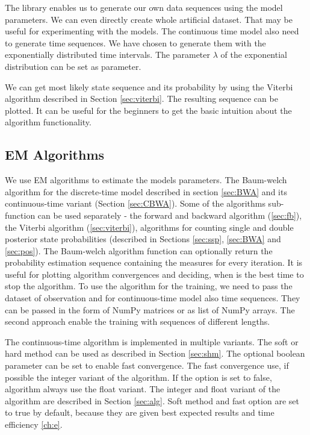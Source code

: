 \documentclass[thesis=M,english]{FITthesis}[2012/10/20]
\begin{document}
The library enables us to generate our own data sequences using the model parameters. We can even directly create whole artificial dataset. That may be useful for experimenting with the models. 
The continuous time model also need to generate time sequences. We have chosen to generate them with the exponentially distributed time intervals. The parameter $\lambda$ of the exponential distribution can be set as parameter.   

We can get most likely state sequence and its probability by using the Viterbi algorithm described in Section \ref{sec:viterbi}. The resulting sequence can be plotted. It can be useful for the beginners to get the basic intuition about the algorithm functionality.   

\subsection{EM Algorithms}

We use EM algorithms to estimate the models parameters. The Baum-welch algorithm for the discrete-time model described in section \ref{sec:BWA} and its continuous-time variant (Section \ref{sec:CBWA}). Some of the algorithms sub-function can be used separately - the forward and backward algorithm (\ref{sec:fb}), the Viterbi algorithm  (\ref{sec:viterbi}), algorithms for counting single and double posterior state probabilities (described in Sections \ref{sec:ssp}, \ref{sec:BWA} and \ref{sec:pos}). 
The Baum-welch algorithm function can optionally return the probability estimation sequence containing the measures for every iteration. It is useful for plotting algorithm convergences and deciding, when is the best time to stop the algorithm. To use the algorithm for the training, we need to pass the dataset of observation and for continuous-time model also time sequences. They can be passed in the form of NumPy matrices or as list of NumPy arrays. The second approach enable the training with sequences of different lengths.

The continuous-time algorithm is implemented in multiple variants. The soft or hard method can be used as described in Section \ref{sec:shm}. The optional boolean parameter can be set to enable fast convergence. The fast convergence use, if possible the integer variant of the algorithm. If the option is set to false, algorithm always use the float variant. The integer and float variant of the algorithm are described in Section \ref{sec:alg}. 
Soft method and fast option are set to true by default, because they are given best expected results and time efficiency \ref{ch:e}.
\end{document}
